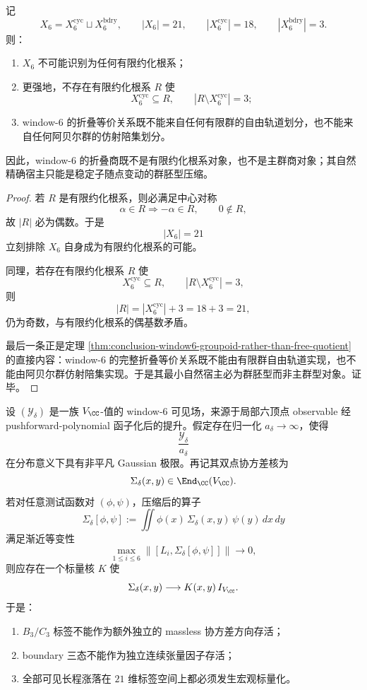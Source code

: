 \begin{proposition}\label{prop:conclusion-window6-not-root-system-not-free-quotient}
记
\[
X_6=X_6^{\mathrm{cyc}}\sqcup X_6^{\mathrm{bdry}},
\qquad
|X_6|=21,
\qquad
|X_6^{\mathrm{cyc}}|=18,
\qquad
|X_6^{\mathrm{bdry}}|=3.
\]
则：
\begin{enumerate}
  \item \(X_6\) 不可能识别为任何有限约化根系；
  \item 更强地，不存在有限约化根系 \(R\) 使
  \[
  X_6^{\mathrm{cyc}}\subseteq R,
  \qquad
  |R\setminus X_6^{\mathrm{cyc}}|=3;
  \]
  \item window-\(6\) 的折叠等价关系既不能来自任何有限群的自由轨道划分，也不能来自任何阿贝尔群的仿射陪集划分。
\end{enumerate}
因此，window-\(6\) 的折叠商既不是有限约化根系对象，也不是主群商对象；其自然精确宿主只能是稳定子随点变动的群胚型压缩。
\end{proposition}
\begin{proof}
若 \(R\) 是有限约化根系，则必满足中心对称
\[
\alpha\in R\Longrightarrow -\alpha\in R,
\qquad
0\notin R,
\]
故 \(|R|\) 必为偶数。于是
\[
|X_6|=21
\]
立刻排除 \(X_6\) 自身成为有限约化根系的可能。

同理，若存在有限约化根系 \(R\) 使
\[
X_6^{\mathrm{cyc}}\subseteq R,
\qquad
|R\setminus X_6^{\mathrm{cyc}}|=3,
\]
则
\[
|R|=|X_6^{\mathrm{cyc}}|+3=18+3=21,
\]
仍为奇数，与有限约化根系的偶基数矛盾。

最后一条正是定理 \ref{thm:conclusion-window6-groupoid-rather-than-free-quotient} 的直接内容：window-\(6\) 的完整折叠等价关系既不能由有限群自由轨道实现，也不能由阿贝尔群仿射陪集实现。于是其最小自然宿主必为群胚型而非主群型对象。证毕。
\end{proof}

\begin{conjecture}[微观全矩阵化迫使宏观协方差标量化]\label{conj:conclusion-window6-microscopic-fullmatrix-macroscopic-scalarization}
设 \((\mathcal Y_\delta)\) 是一族 \(V_{\CC}\)-值的 window-\(6\) 可见场，来源于局部六顶点 observable 经 pushforward-polynomial 函子化后的提升。假定存在归一化 \(a_\delta\to\infty\)，使得
\[
\frac{\mathcal Y_\delta}{a_\delta}
\]
在分布意义下具有非平凡 Gaussian 极限。再记其双点协方差核为
\[
\Sigma_\delta(x,y)\in \End_{\CC}(V_{\CC}).
\]
若对任意测试函数对 \((\phi,\psi)\)，压缩后的算子
\[
\Sigma_\delta[\phi,\psi]
:=
\iint \phi(x)\,\Sigma_\delta(x,y)\,\psi(y)\,dx\,dy
\]
满足渐近等变性
\[
\max_{1\le i\le 6}\bigl\|[L_i,\Sigma_\delta[\phi,\psi]]\bigr\|\longrightarrow 0,
\]
则应存在一个标量核 \(K\) 使
\[
\Sigma_\delta(x,y)\longrightarrow K(x,y)\,I_{V_{\CC}}.
\]
于是：
\begin{enumerate}
  \item \(B_3/C_3\) 标签不能作为额外独立的 massless 协方差方向存活；
  \item boundary 三态不能作为独立连续张量因子存活；
  \item 全部可见长程涨落在 \(21\) 维标签空间上都必须发生宏观标量化。
\end{enumerate}
\end{conjecture}

